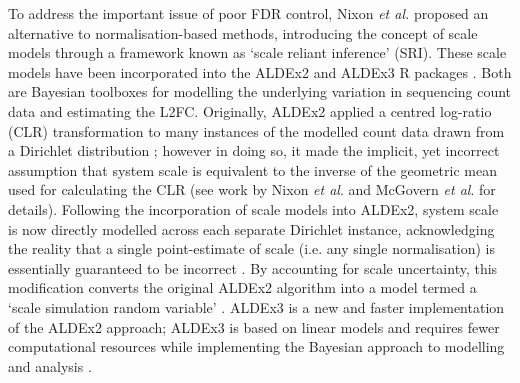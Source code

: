 \documentclass[10pt,letterpaper]{article}
\begin{document}
To address the important issue of poor FDR control, Nixon \textit{et al.} \cite{nixon_scale_2024} proposed an alternative to normalisation-based methods, introducing the concept of scale models through a framework known as `scale reliant inference' (SRI). These scale models have been incorporated into the ALDEx2 and ALDEx3 R packages \cite{gloor_explicit_2025, ALDEx3}. Both are Bayesian toolboxes for modelling the underlying variation in sequencing count data and estimating the L2FC. Originally, ALDEx2 applied a centred log-ratio (CLR) transformation to many instances of the modelled count data drawn from a Dirichlet distribution \cite{fernandes:2014}; however in doing so, it made the implicit, yet incorrect assumption that system scale is equivalent to the inverse of the geometric mean used for calculating the CLR (see work by Nixon \textit{et al}. \cite{nixon_scale_2024} and McGovern \textit{et al}. \cite{mcgovern_addressing_2023} for details). Following the incorporation of scale models into ALDEx2, system scale is now directly modelled across each separate Dirichlet instance, acknowledging the reality that a single point-estimate of scale (i.e. any single normalisation) is essentially guaranteed to be incorrect \cite{gloor_explicit_2025}. By accounting for scale uncertainty, this modification converts the original ALDEx2 algorithm into a model termed a `scale simulation random variable' \cite{nixon_scale_2024}. ALDEx3 is a new and faster implementation of the ALDEx2 approach; ALDEx3 is based on linear models and requires fewer computational resources while implementing the Bayesian approach to modelling and analysis \cite{ALDEx3}.
\end{document}
